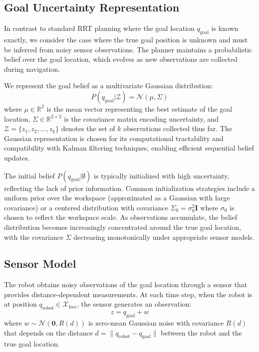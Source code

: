 \subsection{Goal Uncertainty Representation}

In contrast to standard RRT planning where the goal location $q_{\text{goal}}$ is known exactly, we consider the case where the true goal position is unknown and must be inferred from noisy sensor observations. The planner maintains a probabilistic belief over the goal location, which evolves as new observations are collected during navigation.

We represent the goal belief as a multivariate Gaussian distribution:
\begin{equation}
    P(q_{\text{goal}} | \mathcal{Z}) = \mathcal{N}(\mu, \Sigma)
\end{equation}
where $\mu \in \mathbb{R}^2$ is the mean vector representing the best estimate of the goal location, $\Sigma \in \mathbb{R}^{2 \times 2}$ is the covariance matrix encoding uncertainty, and $\mathcal{Z} = \{z_1, z_2, \ldots, z_k\}$ denotes the set of $k$ observations collected thus far. The Gaussian representation is chosen for its computational tractability and compatibility with Kalman filtering techniques, enabling efficient sequential belief updates.

The initial belief $P(q_{\text{goal}} | \emptyset)$ is typically initialized with high uncertainty, reflecting the lack of prior information. Common initialization strategies include a uniform prior over the workspace (approximated as a Gaussian with large covariance) or a centered distribution with covariance $\Sigma_0 = \sigma_0^2 \mathbf{I}$ where $\sigma_0$ is chosen to reflect the workspace scale. As observations accumulate, the belief distribution becomes increasingly concentrated around the true goal location, with the covariance $\Sigma$ decreasing monotonically under appropriate sensor models.

\subsection{Sensor Model}

The robot obtains noisy observations of the goal location through a sensor that provides distance-dependent measurements. At each time step, when the robot is at position $q_{\text{robot}} \in \mathcal{X}_{\text{free}}$, the sensor generates an observation:
\begin{equation}
    z = q_{\text{goal}} + w
\end{equation}
where $w \sim \mathcal{N}(\mathbf{0}, R(d))$ is zero-mean Gaussian noise with covariance $R(d)$ that depends on the distance $d = \|q_{\text{robot}} - q_{\text{goal}}\|$ between the robot and the true goal location.

